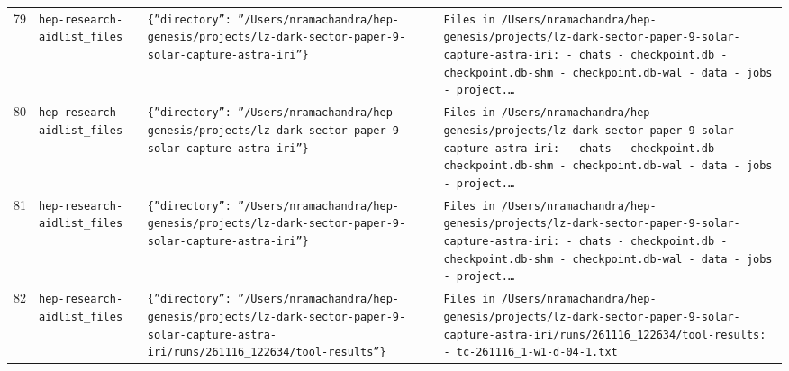 \documentclass[11pt,a4paper]{article}
\begin{document}
\begin{longtable}{@{}p{}p{}p{}p{}@{}}
79 & \texttt{hep-research-aid}\newline\texttt{list\_\allowbreak{}files} & \texttt{\{''directory'':\allowbreak{} ''/\allowbreak{}Users/\allowbreak{}nramachandra/\allowbreak{}hep-genesis/\allowbreak{}projects/\allowbreak{}lz-dark-sector-paper-9-solar-capture-astra-iri''\}\allowbreak{}} & \texttt{Files in /\allowbreak{}Users/\allowbreak{}nramachandra/\allowbreak{}hep-genesis/\allowbreak{}projects/\allowbreak{}lz-dark-sector-paper-9-solar-capture-astra-iri:\allowbreak{}   - chats   - checkpoint.db   - checkpoint.db-shm   - checkpoint.db-wal   - data   - jobs   - project.\ldots{}\allowbreak{}} \\
80 & \texttt{hep-research-aid}\newline\texttt{list\_\allowbreak{}files} & \texttt{\{''directory'':\allowbreak{} ''/\allowbreak{}Users/\allowbreak{}nramachandra/\allowbreak{}hep-genesis/\allowbreak{}projects/\allowbreak{}lz-dark-sector-paper-9-solar-capture-astra-iri''\}\allowbreak{}} & \texttt{Files in /\allowbreak{}Users/\allowbreak{}nramachandra/\allowbreak{}hep-genesis/\allowbreak{}projects/\allowbreak{}lz-dark-sector-paper-9-solar-capture-astra-iri:\allowbreak{}   - chats   - checkpoint.db   - checkpoint.db-shm   - checkpoint.db-wal   - data   - jobs   - project.\ldots{}\allowbreak{}} \\
81 & \texttt{hep-research-aid}\newline\texttt{list\_\allowbreak{}files} & \texttt{\{''directory'':\allowbreak{} ''/\allowbreak{}Users/\allowbreak{}nramachandra/\allowbreak{}hep-genesis/\allowbreak{}projects/\allowbreak{}lz-dark-sector-paper-9-solar-capture-astra-iri''\}\allowbreak{}} & \texttt{Files in /\allowbreak{}Users/\allowbreak{}nramachandra/\allowbreak{}hep-genesis/\allowbreak{}projects/\allowbreak{}lz-dark-sector-paper-9-solar-capture-astra-iri:\allowbreak{}   - chats   - checkpoint.db   - checkpoint.db-shm   - checkpoint.db-wal   - data   - jobs   - project.\ldots{}\allowbreak{}} \\
82 & \texttt{hep-research-aid}\newline\texttt{list\_\allowbreak{}files} & \texttt{\{''directory'':\allowbreak{} ''/\allowbreak{}Users/\allowbreak{}nramachandra/\allowbreak{}hep-genesis/\allowbreak{}projects/\allowbreak{}lz-dark-sector-paper-9-solar-capture-astra-iri/\allowbreak{}runs/\allowbreak{}261116\_\allowbreak{}122634/\allowbreak{}tool-results''\}\allowbreak{}} & \texttt{Files in /\allowbreak{}Users/\allowbreak{}nramachandra/\allowbreak{}hep-genesis/\allowbreak{}projects/\allowbreak{}lz-dark-sector-paper-9-solar-capture-astra-iri/\allowbreak{}runs/\allowbreak{}261116\_\allowbreak{}122634/\allowbreak{}tool-results:\allowbreak{}   - tc-261116\_\allowbreak{}1-w1-d-04-1.txt} \\

\end{longtable}
\end{document}
